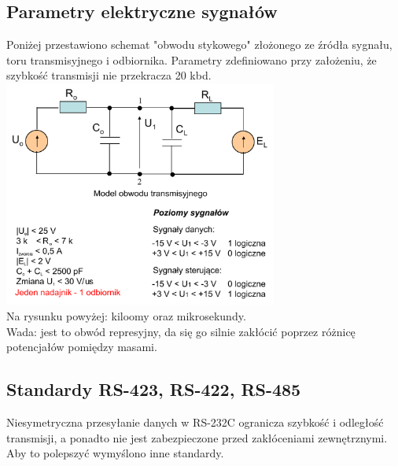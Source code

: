 	\subsection{Parametry elektryczne sygnałów}
	Poniżej przestawiono schemat "obwodu stykowego" złożonego ze źródła sygnału, toru transmisyjnego i odbiornika. Parametry zdefiniowano przy założeniu, że szybkość transmisji nie przekracza 20 kbd.
	\includegraphics[width=9cm]{./wyklady/Rysunek02.pdf}\\
	Na rysunku powyżej: kiloomy oraz mikrosekundy.\\
	Wada: jest to obwód represyjny, da się go silnie zakłócić poprzez różnicę potencjałów pomiędzy masami.
	\subsection{Standardy RS-423, RS-422, RS-485}
	Niesymetryczna przesyłanie danych w RS-232C ogranicza szybkość i odległość transmisji, a ponadto nie jest zabezpieczone przed zakłóceniami zewnętrznymi. Aby to polepszyć wymyślono inne standardy.
